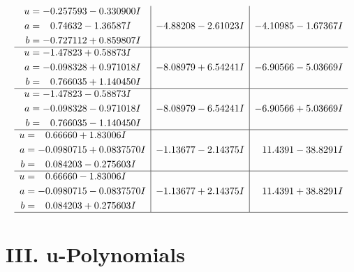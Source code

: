 \documentclass[1p]{elsarticle_modified}
\theoremstyle{definition}
\begin{document}
$$\begin{array}{c|c|c}
\begin{aligned}
u &= -0.257593 - 0.330900 I \\
a &= \phantom{-}0.74632 - 1.36587 I \\
b &= -0.727112 + 0.859807 I\end{aligned}
 & -4.88208 - 2.61023 I & -4.10985 - 1.67367 I \\ \hline\begin{aligned}
u &= -1.47823 + 0.58873 I \\
a &= -0.098328 + 0.971018 I \\
b &= \phantom{-}0.766035 + 1.140450 I\end{aligned}
 & -8.08979 + 6.54241 I & -6.90566 - 5.03669 I \\ \hline\begin{aligned}
u &= -1.47823 - 0.58873 I \\
a &= -0.098328 - 0.971018 I \\
b &= \phantom{-}0.766035 - 1.140450 I\end{aligned}
 & -8.08979 - 6.54241 I & -6.90566 + 5.03669 I \\ \hline\begin{aligned}
u &= \phantom{-}0.66660 + 1.83006 I \\
a &= -0.0980715 + 0.0837570 I \\
b &= \phantom{-}0.084203 - 0.275603 I\end{aligned}
 & -1.13677 - 2.14375 I & \phantom{-}11.4391 - 38.8291 I \\ \hline\begin{aligned}
u &= \phantom{-}0.66660 - 1.83006 I \\
a &= -0.0980715 - 0.0837570 I \\
b &= \phantom{-}0.084203 + 0.275603 I\end{aligned}
 & -1.13677 + 2.14375 I & \phantom{-}11.4391 + 38.8291 I\\
 \hline 
 \end{array}$$\newpage
\newpage\renewcommand{\arraystretch}{1}
\centering \section*{ III. u-Polynomials}
\end{document}
